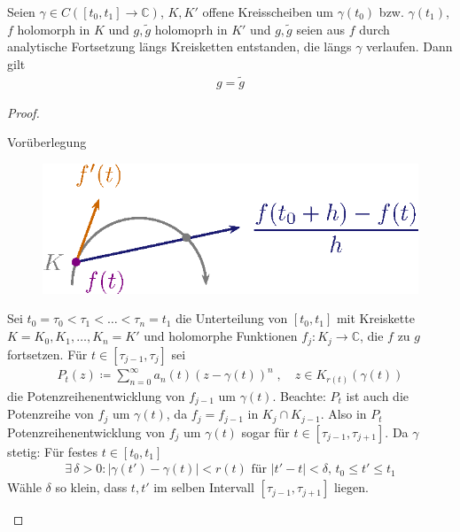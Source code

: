 \documentclass[a4paper,10pt]{scrbook}
\begin{document}
\begin{theorem}[Satz] \label{thm:5.6}
  Seien $\gamma \in C([t_0,t_1] \to \mathbb{C})$, $K,K'$ offene Kreisscheiben um $\gamma(t_0)$ bzw. $\gamma(t_1)$, $f$ holomorph in $K$ und $g,\widetilde{g}$ holomoprh in $K'$ und $g,\widetilde{g}$ seien aus $f$ durch analytische Fortsetzung längs Kreisketten entstanden, die längs $\gamma$ verlaufen. Dann gilt
  \begin{align*}
    g = \widetilde{g}
  \end{align*}

  \begin{proof}
    \begin{enum-arab}
      \item Vorüberlegung

      \begin{figure}[H]
        \centering
        \includegraphics[scale=0.2]{images/ana3-tmp-45}
      \end{figure}

      Sei $t_0 = \tau_0 < \tau_1 < \ldots < \tau_n = t_1$ die Unterteilung von $[t_0,t_1]$ mit Kreiskette $K = K_0,K_1,\ldots,K_n=K'$ und holomorphe Funktionen $f_j : K_j \to \mathbb{C}$, die $f$ zu $g$ fortsetzen. Für $t \in [\tau_{j-1},\tau_j]$ sei
      \begin{align*}
        P_t(z) \coloneq \sum\limits_{n=0}^{\infty} a_n(t) (z-\gamma(t))^n \; , \quad z \in K_{r(t)}(\gamma(t))
      \end{align*}
      die Potenzreihenentwicklung von $f_{j-1}$ um $\gamma(t)$. Beachte: $P_t$ ist auch die Potenzreihe von $f_j$ um $\gamma(t)$, da $f_j = f_{j-1}$ in $K_j \cap K_{j-1}$. Also in $P_t$ Potenzreihenentwicklung von $f_j$ um $\gamma(t)$ sogar für $t \in [\tau_{j-1},\tau_{j+1}]$. Da $\gamma$ stetig: Für festes $t \in [t_0,t_1]$
      \begin{align*}
        \exists \, \delta > 0 : |\gamma(t') - \gamma(t)| < r(t) \text{ für } |t'-t| < \delta \text{, } t_0 \leq t' \leq t_1
      \end{align*}
      Wähle $\delta$ so klein, dass $t,t'$ im selben Intervall $[\tau_{j-1},\tau_{j+1}]$ liegen.


\end{enum-arab}
\end{proof}
\end{theorem}
\end{document}
